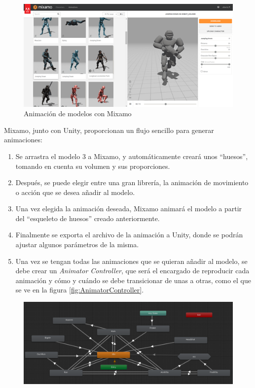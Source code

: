 \begin{enumerate}
  \begin{figure}[h]
	\centering
	\includegraphics[scale=0.9]{img/MixamoScreenshot.png}
	\caption{Animación de modelos con Mixamo}
	\label{fig:AnimaciónMixamo}
    \end{figure}
    Mixamo, junto con Unity, proporcionan un flujo sencillo para generar animaciones:
    \begin{enumerate}
    \item Se arrastra el modelo 3 a Mixamo, y automáticamente creará unos ``huesos'', tomando en cuenta su volumen y sus proporciones.
    \item Después, se puede elegir entre una gran librería, la animación de movimiento o acción que se desea añadir al modelo.
    \item Una vez elegida la animación deseada, Mixamo animará el modelo a partir del ``esqueleto de huesos'' creado anteriormente. 
    \item Finalmente se exporta el archivo de la animación a Unity, donde se podrán ajustar algunos parámetros de la misma.
    \item Una vez se tengan todas las animaciones que se quieran añadir al modelo, se debe crear un \textit{Animator Controller}, que será el encargado de reproducir cada animación y cómo y cuándo se debe transicionar de unas a otras, como el que se ve en la figura \ref{fig:AnimatorController}.
    \end{enumerate}
    \begin{figure}[h]
	\centering
	\includegraphics[scale=0.45]{img/AnimatorController.png}

\end{figure}
\end{enumerate}
